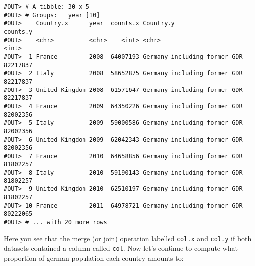 \documentclass[]{book}
\newenvironment{Shaded}{\begin{snugshade}}{\end{snugshade}}
\newcommand{\KeywordTok}[1]{\textcolor[rgb]{0.13,0.29,0.53}{\textbf{#1}}}
\newcommand{\DataTypeTok}[1]{\textcolor[rgb]{0.13,0.29,0.53}{#1}}
\newcommand{\DecValTok}[1]{\textcolor[rgb]{0.00,0.00,0.81}{#1}}
\newcommand{\StringTok}[1]{\textcolor[rgb]{0.31,0.60,0.02}{#1}}
\newcommand{\CommentTok}[1]{\textcolor[rgb]{0.56,0.35,0.01}{\textit{#1}}}
\newcommand{\OperatorTok}[1]{\textcolor[rgb]{0.81,0.36,0.00}{\textbf{#1}}}
\newcommand{\NormalTok}[1]{#1}
\begin{document}
\begin{verbatim}
#OUT> # A tibble: 30 x 5
#OUT> # Groups:   year [10]
#OUT>    Country.x      year  counts.x Country.y                    counts.y
#OUT>    <chr>          <chr>    <int> <chr>                           <int>
#OUT>  1 France         2008  64007193 Germany including former GDR 82217837
#OUT>  2 Italy          2008  58652875 Germany including former GDR 82217837
#OUT>  3 United Kingdom 2008  61571647 Germany including former GDR 82217837
#OUT>  4 France         2009  64350226 Germany including former GDR 82002356
#OUT>  5 Italy          2009  59000586 Germany including former GDR 82002356
#OUT>  6 United Kingdom 2009  62042343 Germany including former GDR 82002356
#OUT>  7 France         2010  64658856 Germany including former GDR 81802257
#OUT>  8 Italy          2010  59190143 Germany including former GDR 81802257
#OUT>  9 United Kingdom 2010  62510197 Germany including former GDR 81802257
#OUT> 10 France         2011  64978721 Germany including former GDR 80222065
#OUT> # ... with 20 more rows
\end{verbatim}

Here you see that the merge (or join) operation labelled \texttt{col.x}
and \texttt{col.y} if both datasets contained a column called
\texttt{col}. Now let's continue to compute what proportion of german
population each country amounts to:

\begin{Shaded}
\end{Shaded}
\end{document}
